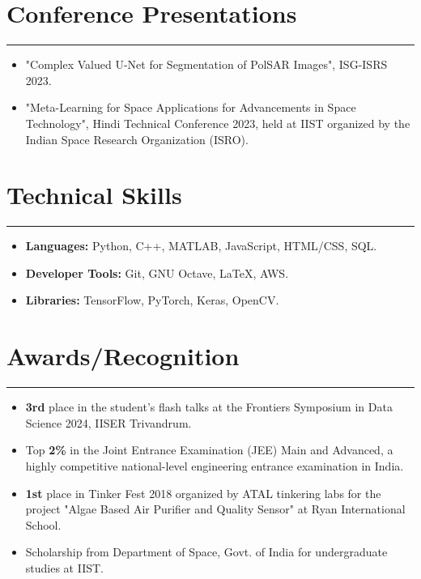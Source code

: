 \documentclass[11pt]{article}
\newlength{\sectionvspace}
\newlength{\sectionvspacee}
\begin{document}
\section*{\bf Conference Presentations}
\vspace{\sectionvspace}%
\rule{\textwidth}{0.4pt}
\begin{itemize}[leftmargin=*,noitemsep,topsep=0pt]
	\item "Complex Valued U-Net for Segmentation of PolSAR Images", ISG-ISRS 2023.
	\item "Meta-Learning for Space Applications for Advancements in Space Technology", Hindi Technical Conference 2023, held at IIST organized by the Indian Space Research Organization (ISRO).
\end{itemize}

\vspace{\sectionvspacee}	
	
	\vspace{\sectionvspacee}
\section*{\bf Technical Skills}
\vspace{\sectionvspace}
\rule{\textwidth}{0.4pt}
\begin{itemize}[leftmargin=*,noitemsep,topsep=0pt]
	\item \textbf{Languages:} Python, C++, MATLAB, JavaScript, HTML/CSS, SQL.
	\item \textbf{Developer Tools:} Git, GNU Octave, LaTeX, AWS.
	\item \textbf{Libraries:} TensorFlow, PyTorch, Keras, OpenCV.
\end{itemize}


\vspace{\sectionvspacee}
\section*{\bf Awards/Recognition}
\vspace{\sectionvspace}
\rule{\textwidth}{0.4pt}
\begin{itemize}[leftmargin=*,noitemsep,topsep=0pt]
	\item \textbf{3rd} place in the student's flash talks at the Frontiers Symposium in Data Science 2024, IISER Trivandrum.
	\item Top \textbf{2\%} in the Joint Entrance Examination (JEE) Main and Advanced, a highly competitive national-level engineering entrance examination in India.
	\item \textbf{1st} place in Tinker Fest 2018 organized by ATAL tinkering labs for the project "Algae Based Air Purifier and Quality Sensor" at Ryan International School.
				\item Scholarship from Department of Space, Govt. of India for undergraduate studies at IIST.
\end{itemize}
\end{document}
